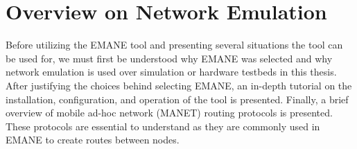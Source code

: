 \chapter{Overview on Network Emulation}
\label{chapter2}
Before utilizing the EMANE tool and presenting several situations the tool can be used for, we must first be understood why EMANE was selected and why network emulation is used over simulation or hardware testbeds in this thesis.
After justifying the choices behind selecting EMANE, an in-depth tutorial on the installation, configuration, and operation of the tool is presented.
Finally, a brief overview of mobile ad-hoc network (MANET) routing protocols is presented.
These protocols are essential to understand as they are commonly used in EMANE to create routes between nodes. \par

